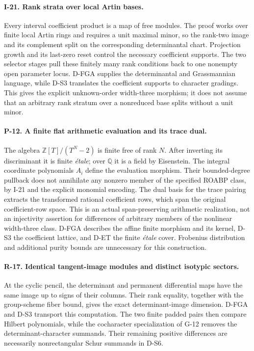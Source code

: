 \paragraph{I-21. Rank strata over local Artin bases.}
Every interval coefficient product is a map of free modules. The proof works over finite local Artin rings and requires a unit maximal minor, so the rank-two image and its complement split on the corresponding determinantal chart. Projection growth and its last-zero reset control the necessary coefficient supports. The two selector stages pull these finitely many rank conditions back to one nonempty open parameter locus. D-FGA supplies the determinantal and Grassmannian language, while D-S3 translates the coefficient supports to character gradings. This gives the explicit unknown-order width-three morphism; it does not assume that an arbitrary rank stratum over a nonreduced base splits without a unit minor.

\paragraph{P-12. A finite flat arithmetic evaluation and its trace dual.}
The algebra $\mathbb Z[T]/(T^N-2)$ is finite free of rank $N$. After inverting its discriminant it is finite \emph{\'etale}; over $\mathbb Q$ it is a field by Eisenstein. The integral coordinate polynomials $A_i$ define the evaluation morphism. Their bounded-degree pullback does not annihilate any nonzero member of the specified ROABP class, by I-21 and the explicit monomial encoding. The dual basis for the trace pairing extracts the transformed rational coefficient rows, which span the original coefficient-row space. This is an actual span-preserving arithmetic realization, not an injectivity assertion for differences of arbitrary members of the nonlinear width-three class. D-FGA describes the affine finite morphism and its kernel, D-S3 the coefficient lattice, and D-ET the finite \emph{\'etale} cover. Frobenius distribution and additional purity bounds are unnecessary for this construction.


\paragraph{R-17. Identical tangent-image modules and distinct isotypic sectors.}
At the cyclic pencil, the determinant and permanent differential maps have the same image up to signs of their columns. Their rank equality, together with the group-scheme fiber bound, gives the exact determinant-image dimension. D-FGA and D-S3 transport this computation. The two finite padded pairs then compare Hilbert polynomials, while the cocharacter specialization of G-12 removes the determinant-character summands. Their remaining positive differences are necessarily nonrectangular Schur summands in D-S6.

